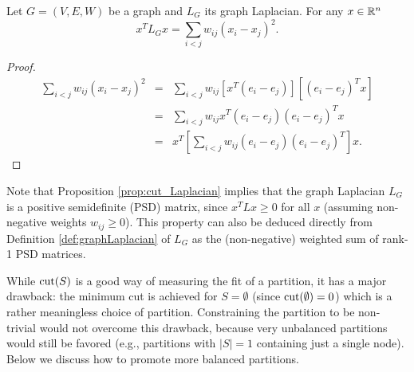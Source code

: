 \begin{proposition}\label{prop:cut_Laplacian}
Let $G=(V,E,W)$ be a graph and $L_G$ its graph Laplacian. For any $x\in\mathbb{R}^n$ %
\[
x^TL_Gx = \sum_{i<j}w_{ij}(x_i-x_j)^2.
\]
\end{proposition}
\begin{proof}
\begin{eqnarray*}
\sum_{i<j}w_{ij}\left( x_i - x_j \right)^2 & = & \sum_{i<j}w_{ij}\left[ x^T \left( e_i - e_j \right) \right]\left[ \left( e_i - e_j \right)^T x \right] \\
 & = & \sum_{i<j}w_{ij} x^T\left( e_i - e_j \right)\left( e_i - e_j \right)^Tx \\
 & = & x^T\left[ \sum_{i<j}w_{ij} \left( e_i - e_j \right)\left( e_i - e_j \right)^T \right]x.
\end{eqnarray*}
\end{proof}
Note that Proposition \ref{prop:cut_Laplacian} implies that the graph Laplacian $L_G$ is a positive semidefinite (PSD) matrix, since $x^T L x \geq 0$ for all $x$ (assuming non-negative weights $w_{ij} \geq 0$). This property can also be deduced directly from Definition \ref{def:graphLaplacian} of $L_G$ as the (non-negative) weighted sum of rank-1 PSD matrices.



While $\operatorname{cut}(S)$ is a good way of measuring the fit of a partition, it has a major drawback: the minimum cut is achieved for $S=\emptyset$ (since $\operatorname{cut}(\emptyset) = 0$) which is a rather meaningless choice of partition. Constraining the partition to be non-trivial would not overcome this drawback, because very unbalanced partitions would still be favored (e.g., partitions with $|S|=1$ containing just a single node). Below we discuss how to promote more balanced partitions.

